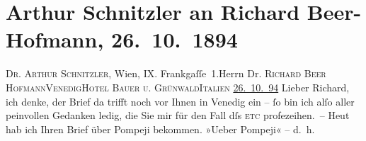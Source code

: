 

         
         \renewcommand{\erwaehntePersonen}{Personen: Richard Beer-Hofmann, Paul Scarron, Friedrich von Schiller}
         \renewcommand{\erwaehnteOrte}{Orte: Frankgasse, Grand Hotel Bauer-Grünwald, I., Innere Stadt, Italien, Pompei, Rom, Venedig, Volkstheater, Wien}
         \renewcommand{\erwaehnteWerke}{Werke: Anatol, Comödianten, Der Komödianten-Roman, Kabale und Liebe, Liebelei. Schauspiel in drei Akten, Sterben. Novelle}
               \section[Arthur Schnitzler an Richard Beer-Hofmann, 26. 10. 1894]{ Arthur Schnitzler an Richard Beer-Hofmann, 26. 10. 1894}\nopagebreak{}\rehead{ }\begin{ledgroupsized}[t]{13cm}\normalsize\beginnumbering \toendnotes[C]{\smallbreak\pagebreak[2]} 
\toendnotes[C]{\smallbreak}\pstart{}{\pb}\textsc{Dr. Arthur Schnitzler}, Wien,
                     IX. Frankgaſſe 1.\pend{}{\bigskip}\pstart{}Herrn Dr. \textsc{Richard Beer Hofmann}\pend{}\pstart{}\textsc{Venedig}\pend{}\pstart{}\textsc{Hotel Bauer u. Grünwald}\pend{}\pstart{}\textsc{Italien}\pend{}{\bigskip}\pstart
           \raggedleft{}{\pb}\uline{26. 10. 94}\pend
           \pstart
           Lieber Richard, ich denke, der Brief da trifft noch vor Ihnen in Venedig ein – ſo bin ich alſo aller peinvollen
               Gedanken ledig, die Sie mir für den Fall dſs \textsc{etc}
               profezeihen. – Heut hab ich Ihren Brief über Pompeji bekommen. »Ueber Pompeji« – d. h.

\end{ledgroupsized}
